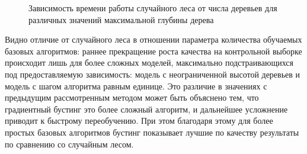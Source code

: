 \documentclass[a4paper, 14pt]{article}
\begin{document}
    \begin{figure}[h]
      \centering
      
      \caption{Зависимость времени работы случайного леса от числа деревьев для различных значений максимальной глубины дерева}\label{forest_md_time}
    \end{figure}

    Видно отличие от случайного леса в отношении параметра количества обучаемых базовых алгоритмов: раннее прекращение роста качества на контрольной выборке происходит лишь для более сложных моделей, максимально подстраивающихся под предоставляемую зависимость: модель с неограниченной высотой деревьев и модель с шагом алгоритма равным единице. Это различие в значениях с предыдущим рассмотренным методом может быть объяснено тем, что градиентный бустинг это более сложный алгоритм, и дальнейшее усложнение приводит к быстрому переобучению. При этом благодаря этому для более простых базовых алгоритмов бустинг показывает лучшие по качеству результаты по сравнению со случайным лесом.
\end{document}
